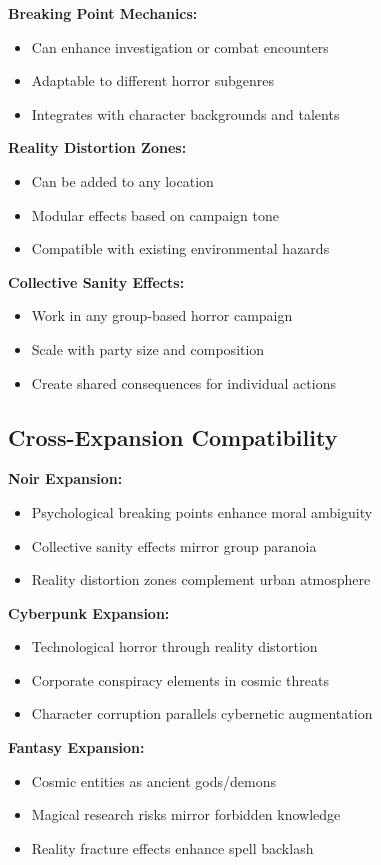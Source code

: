 \documentclass[11pt]{article}
\begin{document}
\textbf{Breaking Point Mechanics:}
\begin{itemize}
\item Can enhance investigation or combat encounters
\item Adaptable to different horror subgenres
\item Integrates with character backgrounds and talents
\end{itemize}

\textbf{Reality Distortion Zones:}
\begin{itemize}
\item Can be added to any location
\item Modular effects based on campaign tone
\item Compatible with existing environmental hazards
\end{itemize}

\textbf{Collective Sanity Effects:}
\begin{itemize}
\item Work in any group-based horror campaign
\item Scale with party size and composition
\item Create shared consequences for individual actions
\end{itemize}

\subsection{Cross-Expansion Compatibility}

\textbf{Noir Expansion:}
\begin{itemize}
\item Psychological breaking points enhance moral ambiguity
\item Collective sanity effects mirror group paranoia
\item Reality distortion zones complement urban atmosphere
\end{itemize}

\textbf{Cyberpunk Expansion:}
\begin{itemize}
\item Technological horror through reality distortion
\item Corporate conspiracy elements in cosmic threats
\item Character corruption parallels cybernetic augmentation
\end{itemize}

\textbf{Fantasy Expansion:}
\begin{itemize}
\item Cosmic entities as ancient gods/demons
\item Magical research risks mirror forbidden knowledge
\item Reality fracture effects enhance spell backlash
\end{itemize}
\end{document}
